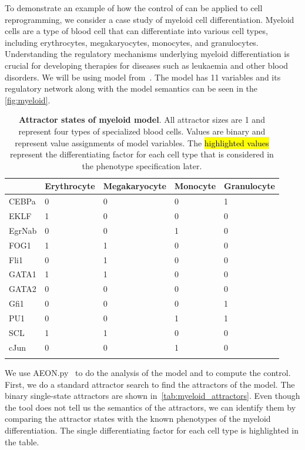 To demonstrate an example of how the control of \PBN{} can be applied to cell reprogramming, we consider a case study of myeloid cell differentiation. Myeloid cells are a type of blood cell that can differentiate into various cell types, including erythrocytes, megakaryocytes, monocytes, and granulocytes. Understanding the regulatory mechanisms underlying myeloid differentiation is crucial for developing therapies for diseases such as leukaemia and other blood disorders. We will be using model from~\cite{Krumsiek2011}. The model has 11 variables and its regulatory network along with the model semantics can be seen in the \autoref{fig:myeloid}. 

\begin{table}[htbp!]
\small
\centering
\caption{\textbf{Attractor states of myeloid model}. All attractor sizes are 1 and represent four types of specialized blood cells. Values are binary and represent value assignments of model variables. The \hl{highlighted values} represent the differentiating factor for each cell type that is considered in the phenotype specification later.}
\label{tab:myeloid_attractors}
\begin{tabular}{p{1.3cm}w{c}{1.9cm}w{c}{2.3cm}w{c}{1.9cm}w{c}{1.9cm}}
\hline
 & \textbf{Erythrocyte} & \textbf{Megakaryocyte} & \textbf{Monocyte} & \textbf{Granulocyte} \\
\hline
CEBPa   & 0 & 0 & 0 & 1 \\
EKLF    & 1 & 0 & 0 & 0 \\
EgrNab  & 0 & 0 & 1 & 0 \\
FOG1    & 1 & 1 & 0 & 0 \\
Fli1    & 0 & 1 & 0 & 0 \\
GATA1   & 1 & 1 & 0 & 0 \\
GATA2   & 0 & 0 & 0 & 0 \\  
Gfi1    & 0 & 0 & 0 & 1 \\
PU1     & 0 & 0 & 1 & 1 \\
SCL     & 1 & 1 & 0 & 0 \\
cJun    & 0 & 0 & 1 & 0 \\
\hline
\label{tab:myeloid_attractors}
\end{tabular}
\end{table}

We use AEON.py~\cite{aeonpy} to do the analysis of the model and to compute the control. First, we do a standard attractor search to find the attractors of the model. The binary single-state attractors are shown in~\autoref{tab:myeloid_attractors}. Even though the tool does not tell us the semantics of the attractors, we can identify them by comparing the attractor states with the known phenotypes of the myeloid differentiation. The single differentiating factor for each cell type is highlighted in the table.

